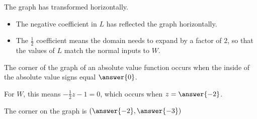 \documentclass{ximera}
\begin{document}
The graph has transformed horizontally. \\


\begin{itemize}
\item The negative coefficient in $L$ has reflected the graph horizontally.
\item The $\frac{1}{2}$ coefficient means the domain needs to expand by a factor of $2$, so that the values of $L$ match the normal inputs to $W$.
\end{itemize}


The corner of the graph of an absolute value function occurs when the inside of the absolute value signs equal $\answer{0}$.


For $W$, this means $-\frac{1}{2}z-1 = 0$, which occurs when $z = \answer{-2}$. 

The corner on the graph is $\left( \answer{-2}, \answer{-3} \right)$
\end{document}

